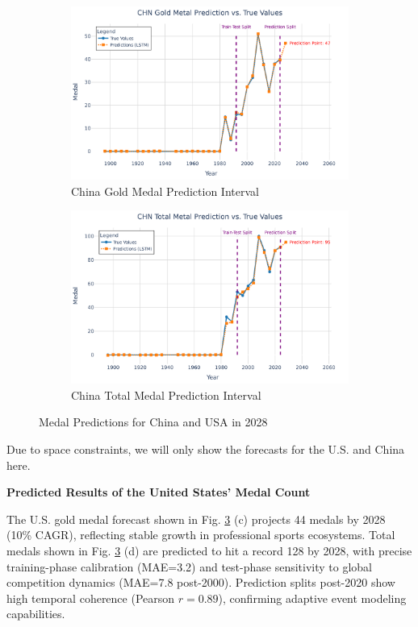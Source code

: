 \documentclass{mcmthesis}
\begin{document}
\begin{figure}[H]
	
	\begin{subfigure}[b]{0.48\textwidth}
		\includegraphics[width=\textwidth]{fig/CHN Gold Metal Prediction vs. True Values.png}
		\caption{China Gold Medal Prediction Interval}
		\label{fig:chn_gold1}
	\end{subfigure}
	\hfill
	\begin{subfigure}[b]{0.48\textwidth}
		\includegraphics[width=\textwidth]{fig/CHN Total Metal Prediction vs. True Values.png}
		\caption{China Total Medal Prediction Interval}
		\label{fig:chn_total1}
	\end{subfigure}
		
		\caption{Medal Predictions for China and USA in 2028}
\label{all}
\end{figure}
Due to space constraints, we will only show the forecasts for the U.S. and China here.


\textbf{Predicted Results of the United States’ Medal Count}

The U.S. gold medal forecast shown in Fig. \ref{all} (c) projects 44 medals by 2028 (10\% CAGR), reflecting stable growth in professional sports ecosystems. Total medals shown in Fig. \ref{all} (d) are predicted to hit a record 128 by 2028, with precise training-phase calibration (MAE=3.2) and test-phase sensitivity to global competition dynamics (MAE=7.8 post-2000). Prediction splits post-2020 show high temporal coherence (Pearson $r=0.89$), confirming adaptive event modeling capabilities.
\end{document}
